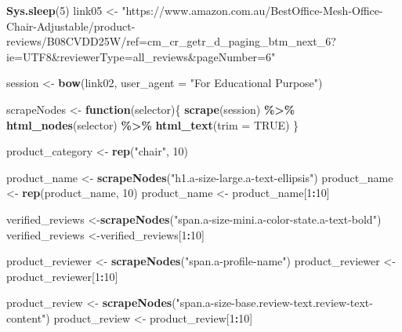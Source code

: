 \documentclass[
]{article}
\newenvironment{Shaded}{\begin{snugshade}}{\end{snugshade}}
\newcommand{\AttributeTok}[1]{\textcolor[rgb]{0.13,0.29,0.53}{#1}}
\newcommand{\ConstantTok}[1]{\textcolor[rgb]{0.56,0.35,0.01}{#1}}
\newcommand{\ControlFlowTok}[1]{\textcolor[rgb]{0.13,0.29,0.53}{\textbf{#1}}}
\newcommand{\DecValTok}[1]{\textcolor[rgb]{0.00,0.00,0.81}{#1}}
\newcommand{\FunctionTok}[1]{\textcolor[rgb]{0.13,0.29,0.53}{\textbf{#1}}}
\newcommand{\NormalTok}[1]{#1}
\newcommand{\OtherTok}[1]{\textcolor[rgb]{0.56,0.35,0.01}{#1}}
\newcommand{\SpecialCharTok}[1]{\textcolor[rgb]{0.81,0.36,0.00}{\textbf{#1}}}
\newcommand{\StringTok}[1]{\textcolor[rgb]{0.31,0.60,0.02}{#1}}
\begin{document}
\begin{Shaded}
\begin{Highlighting}[]
   \FunctionTok{Sys.sleep}\NormalTok{(}\DecValTok{5}\NormalTok{)}
\NormalTok{link05 }\OtherTok{\textless{}{-}} \StringTok{"https://www.amazon.com.au/BestOffice{-}Mesh{-}Office{-}Chair{-}Adjustable/product{-}reviews/B08CVDD25W/ref=cm\_cr\_getr\_d\_paging\_btm\_next\_6?ie=UTF8\&reviewerType=all\_reviews\&pageNumber=6"}


\NormalTok{  session }\OtherTok{\textless{}{-}} \FunctionTok{bow}\NormalTok{(link02,}
               \AttributeTok{user\_agent =} \StringTok{"For Educational Purpose"}\NormalTok{)}

\NormalTok{  scrapeNodes }\OtherTok{\textless{}{-}} \ControlFlowTok{function}\NormalTok{(selector)\{}
    \FunctionTok{scrape}\NormalTok{(session) }\SpecialCharTok{\%\textgreater{}\%}
      \FunctionTok{html\_nodes}\NormalTok{(selector) }\SpecialCharTok{\%\textgreater{}\%}
      \FunctionTok{html\_text}\NormalTok{(}\AttributeTok{trim =} \ConstantTok{TRUE}\NormalTok{)}
\NormalTok{  \}}

\NormalTok{  product\_category }\OtherTok{\textless{}{-}} \FunctionTok{rep}\NormalTok{(}\StringTok{"chair"}\NormalTok{, }\DecValTok{10}\NormalTok{)}

\NormalTok{  product\_name }\OtherTok{\textless{}{-}} \FunctionTok{scrapeNodes}\NormalTok{(}\StringTok{"h1.a{-}size{-}large.a{-}text{-}ellipsis"}\NormalTok{)}
\NormalTok{  product\_name }\OtherTok{\textless{}{-}} \FunctionTok{rep}\NormalTok{(product\_name, }\DecValTok{10}\NormalTok{)}
\NormalTok{  product\_name }\OtherTok{\textless{}{-}}\NormalTok{ product\_name[}\DecValTok{1}\SpecialCharTok{:}\DecValTok{10}\NormalTok{]}
  
\NormalTok{  verified\_reviews }\OtherTok{\textless{}{-}}\FunctionTok{scrapeNodes}\NormalTok{(}\StringTok{"span.a{-}size{-}mini.a{-}color{-}state.a{-}text{-}bold"}\NormalTok{)}
\NormalTok{  verified\_reviews }\OtherTok{\textless{}{-}}\NormalTok{verified\_reviews[}\DecValTok{1}\SpecialCharTok{:}\DecValTok{10}\NormalTok{]}
  
\NormalTok{  product\_reviewer }\OtherTok{\textless{}{-}} \FunctionTok{scrapeNodes}\NormalTok{(}\StringTok{"span.a{-}profile{-}name"}\NormalTok{)}
\NormalTok{  product\_reviewer }\OtherTok{\textless{}{-}}\NormalTok{ product\_reviewer[}\DecValTok{1}\SpecialCharTok{:}\DecValTok{10}\NormalTok{]}
  
\NormalTok{  product\_review }\OtherTok{\textless{}{-}} \FunctionTok{scrapeNodes}\NormalTok{(}\StringTok{"span.a{-}size{-}base.review{-}text.review{-}text{-}content"}\NormalTok{)}
\NormalTok{  product\_review }\OtherTok{\textless{}{-}}\NormalTok{ product\_review[}\DecValTok{1}\SpecialCharTok{:}\DecValTok{10}\NormalTok{]}
  

\end{Highlighting}
\end{Shaded}
\end{document}

